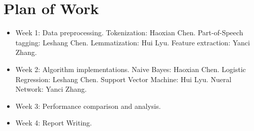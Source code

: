 \section{Plan of Work}
\begin{itemize}
  \item Week 1: Data preprocessing. 
      Tokenization: Haoxian Chen.
      Part-of-Speech tagging: Leshang Chen.
      Lemmatization: Hui Lyu.
      Feature extraction: Yanci Zhang.
  \item Week 2: Algorithm implementations.
      Naive Bayes: Haoxian Chen.
      Logistic Regression: Leshang Chen.
      Support Vector Machine: Hui Lyu.
      Nueral Network: Yanci Zhang.
  \item Week 3: Performance comparison and analysis. 
  \item Week 4: Report Writing.
\end{itemize}

